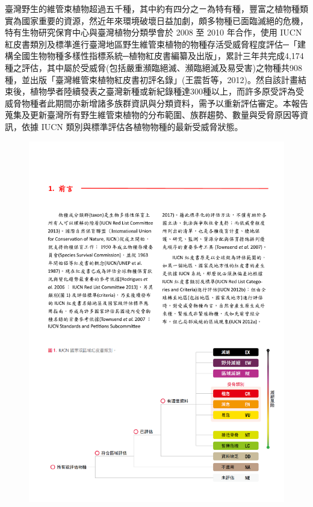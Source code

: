 \begin{multicols}{2}
臺灣野生的維管束植物超過五千種，其中約有四分之ㄧ為特有種，豐富之植物種類實為國家重要的資源，然近年來環境破壞日益加劇，頗多物種已面臨滅絕的危機，特有生物研究保育中心與臺灣植物分類學會於 2008 至 2010 年合作，使用 IUCN 紅皮書類別及標準進行臺灣地區野生維管束植物的物種存活受威脅程度評估─「建構全國生物物種多樣性指標系統─植物紅皮書編纂及出版」，累計三年共完成4,174種之評估，其中屬於受威脅(包括嚴重瀕臨絕滅、瀕臨絕滅及易受害)之物種共908種，並出版「臺灣維管束植物紅皮書初評名錄」(王震哲等，2012)。然自該計畫結束後，植物學者陸續發表之臺灣新種或新紀錄種達300種以上，而許多原受評為受威脅物種者此期間亦新增諸多族群資訊與分類資料，需予以重新評估審定。本報告蒐集及更新臺灣所有野生維管束植物的分布範圍、族群趨勢、數量與受脅原因等資訊，依據 IUCN 類別與標準評估各植物物種的最新受威脅狀態。\\
\end{multicols}
\begin{figure}[!ht]
    \includegraphics[width=\textwidth]{fig1.pdf}
\end{figure}

%

